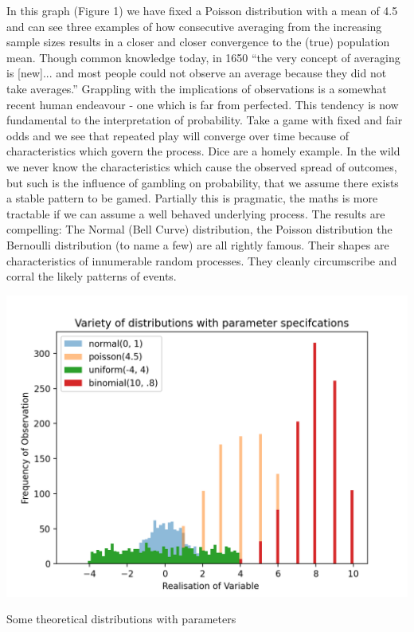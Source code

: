 \documentclass{tufte-handout}
\begin{document}
\noindent In this graph (Figure 1) we have fixed a Poisson distribution with a mean of 4.5 and can see three examples of how consecutive averaging from the increasing sample sizes results in a closer and closer convergence to the (true) population mean. Though common knowledge today, in 1650 ``the very concept of averaging is [new]... and most people could not observe an average because they did not take averages.''\cite{HackingEmergence} Grappling with the implications of observations is a somewhat recent human endeavour - one which is far from perfected. This tendency is now fundamental to the interpretation of probability. Take a game with fixed and fair odds and we see that repeated play will converge over time because of characteristics which govern the process. Dice are a homely example. In the wild we never know the characteristics which cause the observed spread of outcomes, but such is the influence of gambling on probability, that we assume there exists a stable pattern to be gamed. Partially this is pragmatic, the maths is more tractable if we can assume a well behaved underlying process. The results are compelling: The Normal (Bell Curve) distribution, the Poisson distribution the Bernoulli distribution (to name a few) are all rightly famous. Their shapes are characteristics of innumerable random processes. They cleanly circumscribe and corral the likely patterns of events. 
\linebreak
\begin{marginfigure}
  \includegraphics[width=\linewidth]{../Expectation/Plots/variety_of_distributions.png}
  \caption{Some theoretical distributions with parameters}
\end{marginfigure}
\end{document}
